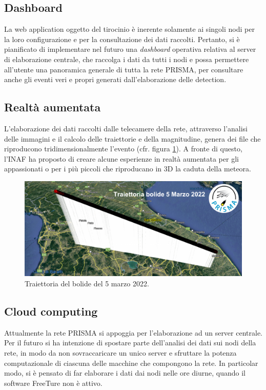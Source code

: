 \subsection{Dashboard}

La web application oggetto del tirocinio è inerente solamente ai singoli nodi per la loro configurazione e per la consultazione dei dati raccolti. Pertanto, si è pianificato di implementare nel futuro una \emph{dashboard} operativa relativa al server di elaborazione centrale, che raccolga i dati da tutti i nodi e possa permettere all'utente una panoramica generale di tutta la rete PRISMA, per consultare anche gli eventi veri e propri generati dall'elaborazione delle detection.

\subsection{Realtà aumentata}

L'elaborazione dei dati raccolti dalle telecamere della rete, attraverso l'analisi delle immagini e il calcolo delle traiettorie e della magnitudine, genera dei file che riproducono tridimensionalmente l'evento (cfr. figura \ref{fig:bolide-050322}). A fronte di questo, l'INAF ha proposto di creare alcune esperienze in realtà aumentata per gli appassionati o per i più piccoli che riproducano in 3D la caduta della meteora.

\begin{figure}
\includegraphics[width=\textwidth]{images/traiettoria-20220305.png}
\caption{Traiettoria del bolide del 5 marzo 2022. \cite{bolide-050322}}
\label{fig:bolide-050322}
\end{figure}

\subsection{Cloud computing}

Attualmente la rete PRISMA si appoggia per l'elaborazione ad un server centrale. Per il futuro si ha intenzione di spostare parte dell'analisi dei dati sui nodi della rete, in modo da non sovraccaricare un unico server e sfruttare la potenza computazionale di ciascuna delle macchine che compongono la rete. In particolar modo, si è pensato di far elaborare i dati dai nodi nelle ore diurne, quando il software FreeTure non è attivo.

